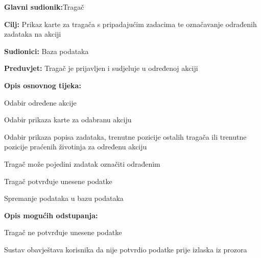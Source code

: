 	
			
			
				
				\noindent {}
				\begin{packed_item}
					
					\item \textbf{Glavni sudionik:}Tragač
					\item  \textbf{Cilj:} Prikaz karte za tragača s pripadajućim zadacima te označavanje odrađenih zadataka na akciji
					\item  \textbf{Sudionici:} Baza podataka
					\item  \textbf{Preduvjet:} Tragač je prijavljen i sudjeluje u određenoj akciji
					\item  \textbf{Opis osnovnog tijeka:}
					
					\item[] \begin{packed_enum}
						
						\item Odabir određene akcije
						\item Odabir prikaza karte za odabranu akciju
						\item Odabir prikaza popisa zadataka, trenutne pozicije ostalih tragača ili trenutne pozicije praćenih životinja za određenu akciju
						\item Tragač može pojedini zadatak označiti odrađenim
						\item Tragač potvrđuje unesene podatke
						\item Spremanje podataka u bazu podataka
					\end{packed_enum}
					
					\item  \textbf{Opis mogućih odstupanja:}
					
					\item[] \begin{packed_item}
						
						
						\item[5.a] Tragač ne potvrđuje unesene podatke
						\item[] \begin{packed_enum}
							
							\item Sustav obavještava korisnika da nije potvrdio podatke prije izlaska iz prozora
							
						\end{packed_enum}
						
					\end{packed_item}
					
				\end{packed_item}
				
